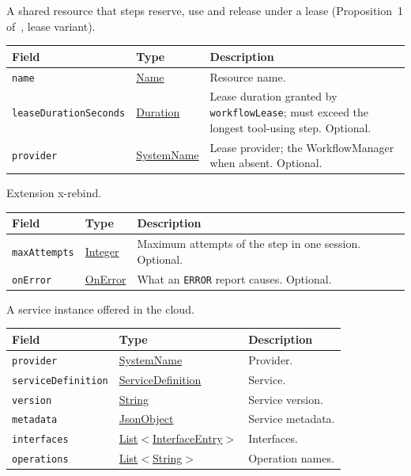 \documentclass[a4paper]{arrowhead}
\newcommand{\mref}[1]{{\textcolor{ArrowheadPurple}{\hyperref[sec:model:#1]{#1}}}}
\newcommand{\pref}[1]{{\textcolor{ArrowheadGrey}{\hyperref[sec:model:primitives:#1]{#1}}}}
\begin{document}
A shared resource that steps reserve, use and release under a lease (Proposition~1 of~\cite{varga2026}, lease variant).

{\small
\begin{longtable}{|p{3.9cm}|p{4.4cm}|p{7.5cm}|}

\hline
\rowcolor{gray!33} Field & Type & Description \\ \hline
\endhead
\texttt{name} & \pref{Name} & Resource name. \\ \hline
\texttt{leaseDurationSeconds} & \pref{Duration} & Lease duration granted by \texttt{workflowLease}; must exceed the longest tool-using step. Optional. \\ \hline
\texttt{provider} & \pref{SystemName} & Lease provider; the WorkflowManager when absent. Optional. \\ \hline
\end{longtable}
}

Extension x-rebind.

{\small
\begin{longtable}{|p{3.9cm}|p{4.4cm}|p{7.5cm}|}

\hline
\rowcolor{gray!33} Field & Type & Description \\ \hline
\endhead
\texttt{maxAttempts} & \pref{Integer} & Maximum attempts of the step in one session. Optional. \\ \hline
\texttt{onError} & \mref{OnError} & What an \texttt{ERROR} report causes. Optional. \\ \hline
\end{longtable}
}

A service instance offered in the cloud.

{\small
\begin{longtable}{|p{3.9cm}|p{4.4cm}|p{7.5cm}|}

\hline
\rowcolor{gray!33} Field & Type & Description \\ \hline
\endhead
\texttt{provider} & \pref{SystemName} & Provider. \\ \hline
\texttt{serviceDefinition} & \pref{ServiceDefinition} & Service. \\ \hline
\texttt{version} & \pref{String} & Service version. \\ \hline
\texttt{metadata} & \pref{JsonObject} & Service metadata. \\ \hline
\texttt{interfaces} & \pref{List}$<$\mref{InterfaceEntry}$>$ & Interfaces. \\ \hline
\texttt{operations} & \pref{List}$<$\pref{String}$>$ & Operation names. \\ \hline
\end{longtable}
}
\end{document}
